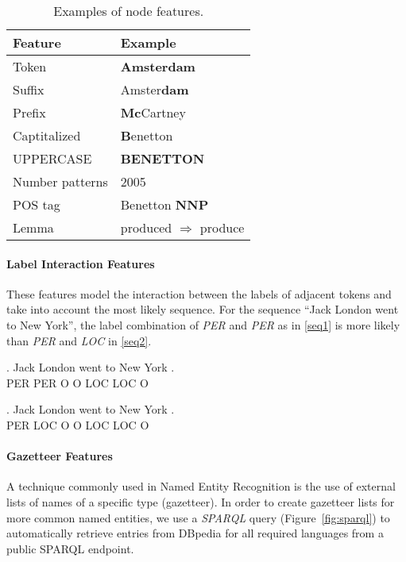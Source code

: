 \documentclass[11pt]{article}
\begin{document}
\begin{table}[h!]
\small
\begin{tabular}{ l l }
\bf Feature & \bf Example \\
\hline
Token &  \textbf{Amsterdam}\\
Suffix& Amster\textbf{dam}\\
Prefix&  \textbf{Mc}Cartney\\
Captitalized& \textbf{B}enetton\\
UPPERCASE &  \textbf{BENETTON}\\
Number patterns & 2005\\
POS tag &  Benetton \textbf{NNP}   \\
Lemma & produced $\Rightarrow$ produce \\

\end{tabular}


\caption{\normalsize Examples of node features.}
\label{table:node}
\end{table}

\paragraph*{Label Interaction Features}
These features model the interaction between the labels of adjacent tokens and take into account the most likely sequence. 
For the sequence ``Jack London went to New York'', the label combination of \emph{PER} and \emph{PER} as in \ref{seq1} is more likely than \emph{PER} and \emph{LOC} in \ref{seq2}.

\exg. Jack London went to New York .\\
      PER   PER   O    O  LOC LOC  O \\\label{seq1}

\exg. Jack London went to New York . \\ 
      PER  LOC    O    O  LOC LOC O \\\label{seq2}
    

\paragraph*{Gazetteer Features}
A technique commonly used in Named Entity Recognition is the use of external lists of names of a specific type (gazetteer). In order to create gazetteer lists for more common named entities, we use a \emph{SPARQL} query  (Figure~\ref{fig:sparql}) to automatically retrieve entries from DBpedia for all required languages from a public SPARQL endpoint.
\end{document}
